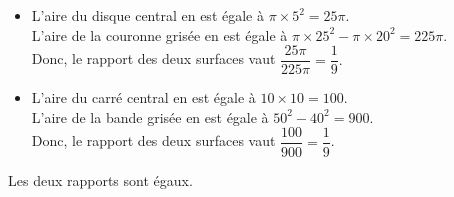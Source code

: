    \begin{itemize}
      \item L'aire du disque central en \ucmq{} est égale à $\pi\times5^2 =25\pi$. \\
         L'aire de la couronne grisée en \ucmq{} est égale à $\pi\times25^2 -\pi\times20^2=225\pi$. \\ [1mm]
         Donc, le rapport des deux surfaces vaut $\dfrac{25\pi}{225\pi} =  \dfrac19.$
      \bigskip
      \item L'aire du carré central en \ucmq{} est égale à $10\times10 =100$. \\
         L'aire de la bande grisée en \ucmq{} est égale à $50^2-40^2 =900$. \\ [1mm]
         Donc, le rapport des deux surfaces vaut $\dfrac{100}{900} =\dfrac19$.
   \end{itemize}
   {\blue Les deux rapports sont égaux}.
